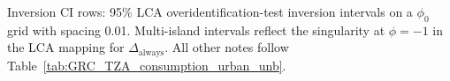 \begin{landscape}
\begin{table}[htbp]\centering
\caption{Preview---restricted GRC estimates of the returns to urban location on log consumption per capita, Tanzania (unbalanced)}
\label{tab:GRC_TZA_consumption_urban_unb_PREVIEW}
\begin{threeparttable}

\begin{tablenotes}[flushleft]\footnotesize
\item Inversion CI rows: 95\% LCA overidentification-test inversion intervals on a $\phi_0$ grid with spacing 0.01.
Multi-island intervals reflect the singularity at $\phi=-1$ in the LCA mapping for $\Delta_{\text{always}}$.
All other notes follow Table~\ref{tab:GRC_TZA_consumption_urban_unb}.
\end{tablenotes}
\end{threeparttable}
\end{table}
\end{landscape}
